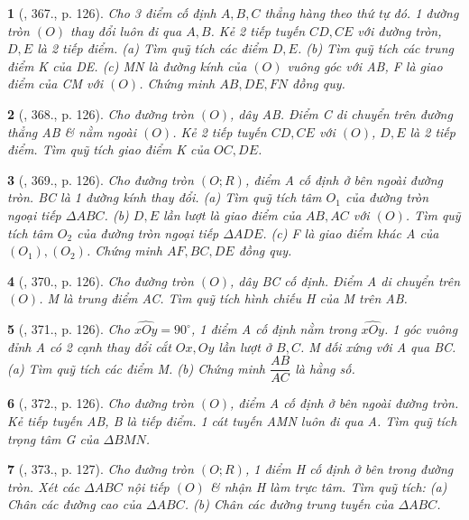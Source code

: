 \documentclass{article}
\newtheorem{baitoan}{}
\begin{document}
\begin{baitoan}[\cite{Binh_Toan_9_tap_2}, 367., p. 126]
	Cho 3 điểm cố định $A,B,C$ thẳng hàng theo thứ tự đó. 1 đường tròn $(O)$ thay đổi luôn đi qua $A,B$. Kẻ 2 tiếp tuyến $CD,CE$ với đường tròn, $D,E$ là 2 tiếp điểm. (a) Tìm quỹ tích các điểm $D,E$. (b) Tìm quỹ tích các trung điểm K của DE. (c) MN là đường kính của $(O)$ vuông góc với AB, F là giao điểm của CM với $(O)$. Chứng minh $AB,DE,FN$ đồng quy.
\end{baitoan}

\begin{baitoan}[\cite{Binh_Toan_9_tap_2}, 368., p. 126]
	Cho đường tròn $(O)$, dây AB. Điểm C di chuyển trên đường thẳng AB \& nằm ngoài $(O)$. Kẻ 2 tiếp tuyến $CD,CE$ với $(O)$, $D,E$ là 2 tiếp điểm. Tìm quỹ tích giao điểm K của $OC,DE$.
\end{baitoan}

\begin{baitoan}[\cite{Binh_Toan_9_tap_2}, 369., p. 126]
	Cho đường tròn $(O;R)$, điểm A cố định ở bên ngoài đường tròn. BC là 1 đường kính thay đổi. (a) Tìm quỹ tích tâm $O_1$ của đường tròn ngoại tiếp $\Delta ABC$. (b) $D,E$ lần lượt là giao điểm của $AB,AC$ với $(O)$. Tìm quỹ tích tâm $O_2$ của đường tròn ngoại tiếp $\Delta ADE$. (c) F là giao điểm khác A của $(O_1),(O_2)$. Chứng minh $AF,BC,DE$ đồng quy.
\end{baitoan}

\begin{baitoan}[\cite{Binh_Toan_9_tap_2}, 370., p. 126]
	Cho đường tròn $(O)$, dây BC cố định. Điểm A di chuyển trên $(O)$. M là trung điểm AC. Tìm quỹ tích hình chiếu H của M trên AB.
\end{baitoan}

\begin{baitoan}[\cite{Binh_Toan_9_tap_2}, 371., p. 126]
	Cho $\widehat{xOy} = 90^\circ$, 1 điểm A cố định nằm trong $\widehat{xOy}$. 1 góc vuông đỉnh A có 2 cạnh thay đổi cắt $Ox,Oy$ lần lượt ở $B,C$. M đối xứng với A qua BC. (a) Tìm quỹ tích các điểm M. (b) Chứng minh $\dfrac{AB}{AC}$ là hằng số.
\end{baitoan}

\begin{baitoan}[\cite{Binh_Toan_9_tap_2}, 372., p. 126]
	Cho đường tròn $(O)$, điểm A cố định ở bên ngoài đường tròn. Kẻ tiếp tuyến AB, B là tiếp điểm. 1 cát tuyến AMN luôn đi qua A. Tìm quỹ tích trọng tâm G của $\Delta BMN$.
\end{baitoan}

\begin{baitoan}[\cite{Binh_Toan_9_tap_2}, 373., p. 127]
	Cho đường tròn $(O;R)$, 1 điểm H cố định ở bên trong đường tròn. Xét các $\Delta ABC$ nội tiếp $(O)$ \& nhận H làm trực tâm. Tìm quỹ tích: (a) Chân các đường cao của $\Delta ABC$. (b) Chân các đường trung tuyến của $\Delta ABC$.
\end{baitoan}
\end{document}
